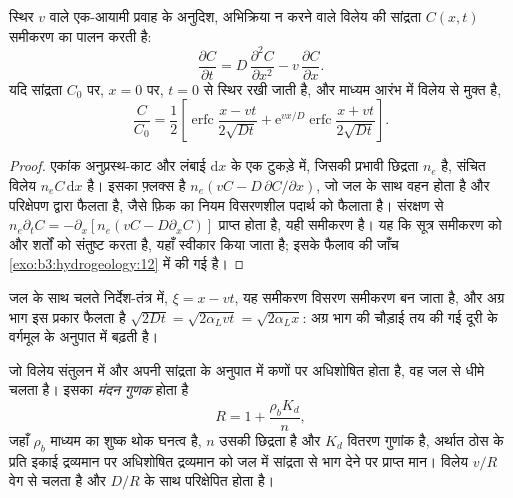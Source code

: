 \begin{theorem}\label{thm:b3:hydrogeology:ade}
स्थिर  $v$ वाले एक-आयामी प्रवाह के अनुदिश,
अभिक्रिया न करने वाले विलेय की सांद्रता $C(x, t)$ समीकरण का पालन करती है:
\[
\frac{\partial C}{\partial t} = D\,\frac{\partial^2C}{\partial x^2} -
v\,\frac{\partial C}{\partial x} .
\]
यदि सांद्रता $C_0$ पर, $x = 0$ पर, $t = 0$ से स्थिर रखी जाती है, और माध्यम
आरंभ में विलेय से मुक्त है,
\[
\frac{C}{C_0} = \frac12\left[\operatorname{erfc}\frac{x - vt}{2\sqrt{Dt}} +
\mathrm e^{vx/D}\operatorname{erfc}\frac{x + vt}{2\sqrt{Dt}}\right] .
\]
\end{theorem}

\begin{proof}
एकांक अनुप्रस्थ-काट और लंबाई $\mathrm dx$ के एक टुकड़े में, जिसकी प्रभावी
छिद्रता $n_e$ है, संचित विलेय $n_eC\,\mathrm dx$ है। इसका फ़्लक्स है
$n_e(vC - D\,\partial C/\partial x)$, जो जल के साथ वहन होता है और
परिक्षेपण द्वारा फैलता है, जैसे फ़िक का नियम विसरणशील पदार्थ को फैलाता है। संरक्षण से
$n_e\partial_tC = -\partial_x[n_e(vC - D\partial_xC)]$ प्राप्त होता है, यही समीकरण है।
यह कि सूत्र समीकरण को और शर्तों को संतुष्ट करता है, यहाँ स्वीकार किया जाता है;
इसके फैलाव की जाँच \cref{exo:b3:hydrogeology:12} में की गई है।
\end{proof}

जल के साथ चलते निर्देश-तंत्र में, $\xi = x - vt$, यह समीकरण
विसरण समीकरण बन जाता है, और अग्र भाग इस प्रकार फैलता है $\sqrt{2Dt} = \sqrt{2\alpha_L
vt} = \sqrt{2\alpha_Lx}$: अग्र भाग की चौड़ाई
तय की गई दूरी के वर्गमूल के अनुपात में बढ़ती है।

\begin{definition}[मंदन गुणक]\label{def:b3:hydrogeology:retardation}
जो विलेय संतुलन में और अपनी सांद्रता के अनुपात में कणों पर अधिशोषित होता है,
वह जल से धीमे चलता है। इसका
\emph{मंदन गुणक} होता है
\[
R = 1 + \frac{\rho_bK_d}{n} ,
\]
जहाँ $\rho_b$ माध्यम का शुष्क थोक घनत्व है, $n$ उसकी छिद्रता है और
$K_d$ वितरण गुणांक है, अर्थात ठोस के प्रति इकाई द्रव्यमान पर अधिशोषित द्रव्यमान
को जल में सांद्रता से भाग देने पर प्राप्त मान। विलेय $v/R$ वेग से चलता है
और $D/R$ के साथ परिक्षेपित होता है।
\end{definition}

